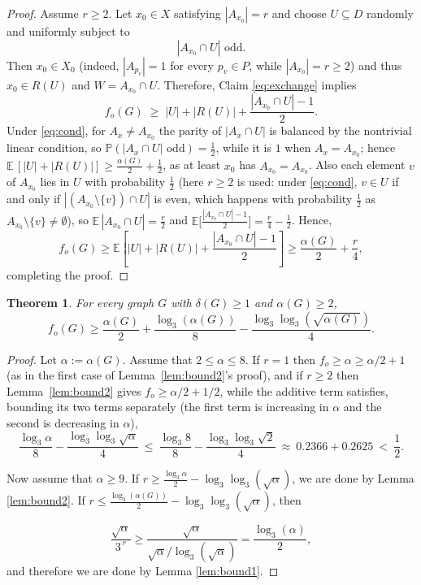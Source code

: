 \documentclass[11pt]{article}
\newcommand{\VV}[1]{{#1}}
\newtheorem{theorem}{Theorem}
\theoremstyle{definition}
\theoremstyle{remark}
\newcommand{\1}{\mathbf{1}}
\begin{document}
\begin{proof}
		Assume $r \ge 2$. Let $x_0 \in X$ satisfying $|A_{x_0}| = r$ and choose $U \subseteq D$ randomly and uniformly subject to
		\begin{equation}\label{eq:cond}
			|A_{x_0} \cap U| \text{ odd.}
		\end{equation}
		Then \VV{$x_0\in X_0$ (indeed, $|A_{p_v}|=1$ for every $p_v\in P$, while $|A_{x_0}|=r\ge 2$) and thus} $x_0 \in R(U)$ and $W = A _{x_0}\cap U$. Therefore, Claim \ref{eq:exchange} implies
		\[
		f_o(G) \;\ge\; |U|+ |R(U)| + \frac{|A_{x_0} \cap U| - 1}{2}.
		\]
		Under \eqref{eq:cond}, for $A_x \ne A_{x_0}$ the parity of $|A_x \cap U|$ is balanced
		by the nontrivial linear condition, so $\mathbb{P}(|A_x \cap U|\text{ odd}) = \tfrac12$,
		while it is $1$ when $A_x = A_{x_0}$; hence $\mathbb{E}\,[|U|+|R(U)|] \ge \frac{\alpha(G)}{2} + \frac12$,
		as at least $x_0$ has $A_{x_0} = A_{x_0}$. Also each element \VV{$v$} of $A_{x_0}$ lies in $U$ with probability $\tfrac12$ \VV{(here $r\ge 2$ is used: under \eqref{eq:cond}, $v\in U$ if and only if $|(A_{x_0}\setminus\{v\})\cap U|$ is even, which happens with probability $\tfrac12$ as $A_{x_0}\setminus\{v\}\neq\emptyset$)}, so $\mathbb{E}\,|A_{x_0} \cap U| = \frac r2$ and
		$\mathbb{E}\bigl[\frac{|A_{x_0} \cap U| - 1}{2}\bigr] = \frac r4 - \frac12$. Hence,
		\[
		f_o(G)\geq\mathbb{E}\!\left[ |U| + |R(U)| + \frac{|A_{x_0} \cap U| - 1}{2} \right]
		\ge \frac{\alpha(G)}{2} + \frac r4,
		\]
		completing the proof. 
	\end{proof}
	\begin{theorem}\label{thm:logbound}
		For every graph $G$ with $\delta(G)\geq 1$ and $\alpha(G)\ge 2$,
		\[f_o(G) \ge \frac{\alpha(G)}{2} + \frac{\log_3(\alpha(G))}{8}-\frac{\log_3\log_3(\sqrt{\alpha(G)})}{4}.\]
	\end{theorem}
	\begin{proof}
		Let $\alpha:=\alpha(G)$. 
		Assume that $2\le\alpha\le 8$. If $r=1$ then $f_o\ge\alpha\ge\alpha/2+1$
		(as in the first case of \VV{Lemma~\ref{lem:bound2}'s} proof), and if $r\ge 2$ then
		\VV{Lemma~\ref{lem:bound2}} gives $f_o\ge\alpha/2+1/2$, while the additive term satisfies\VV{, bounding its two terms separately (the first term is increasing in $\alpha$ and the second is decreasing in $\alpha$),}
		\[
		\frac{\log_3\alpha}{8}-\frac{\log_3\log_3\sqrt\alpha}{4}
		\ \le\ \frac{\log_3 8}{8}-\frac{\log_3\log_3\sqrt 2}{4}
		\ \approx\ 0.2366+0.2625\ <\ \frac12.
		\]
		
		
		Now assume that $\alpha\ge 9$. If $r\ge \frac{\log_3 \alpha}{2}-\log_3\log_3(\sqrt{\alpha})$, we are done by Lemma \ref{lem:bound2}. If $r\le \frac{\log_3(\alpha(G))}{2}-\log_3\log_3(\sqrt{\alpha})$, then
		
		\[\frac{\sqrt{\alpha}}{ 3^{\,r}}\geq \frac{\sqrt{\alpha}}{\sqrt{\alpha}/\log_3(\sqrt{\alpha})}=\frac{\log_3(\alpha)}{2},\]
		and therefore we are done by Lemma \ref{lem:bound1}.
	\end{proof}
	
\end{document}
